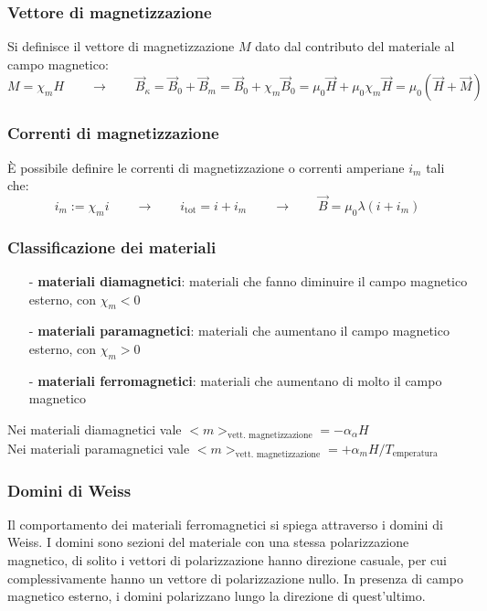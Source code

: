 \documentclass[a4paper]{article}
\begin{document}
\subsubsection*{Vettore di magnetizzazione}
Si definisce il vettore di magnetizzazione \(M\) dato dal contributo del materiale al campo magnetico:
\[M = \chi_m H \qquad \rightarrow \qquad \vec{B}_\kappa = \vec{B}_0 + \vec{B}_m = \vec{B}_0 + \chi_m \vec{B}_0 = \mu_0 \vec{H} + \mu_0 \chi_m \vec{H} = \mu_0(\vec{H} + \vec{M})\]

\subsubsection*{Correnti di magnetizzazione}
È possibile definire le correnti di magnetizzazione o correnti amperiane \(i_m\) tali che:
\[i_m := \chi_m i \qquad \rightarrow \qquad i_\text{tot} = i + i_m \qquad \rightarrow \qquad \vec{B} = \mu_0 \lambda (i + i_m)\]

\subsubsection*{Classificazione dei materiali}
\begin{itemize}[topsep=3pt, itemsep=0pt]
	\item[-] \textbf{materiali diamagnetici}: materiali che fanno diminuire il campo magnetico esterno, con \(\chi_m < 0\)
	\item[-] \textbf{materiali paramagnetici}: materiali che aumentano il campo magnetico esterno, con \(\chi_m > 0\)
	\item[-] \textbf{materiali ferromagnetici}: materiali che aumentano di molto il campo magnetico
\end{itemize}
Nei materiali diamagnetici vale \(\displaystyle <m>_\text{vett. magnetizzazione} = - \alpha_\alpha H\) \\
Nei materiali paramagnetici vale \(\displaystyle <m>_\text{vett. magnetizzazione} = + \alpha_m H/T_\text{emperatura}\)

\subsubsection*{Domini di Weiss}
Il comportamento dei materiali ferromagnetici si spiega attraverso i domini di Weiss. I domini sono sezioni del materiale con una
stessa polarizzazione magnetico, di solito i vettori di polarizzazione hanno direzione casuale, per cui complessivamente hanno 
un vettore di polarizzazione nullo. In presenza di campo magnetico esterno, i domini polarizzano lungo la direzione di quest'ultimo.
\end{document}
